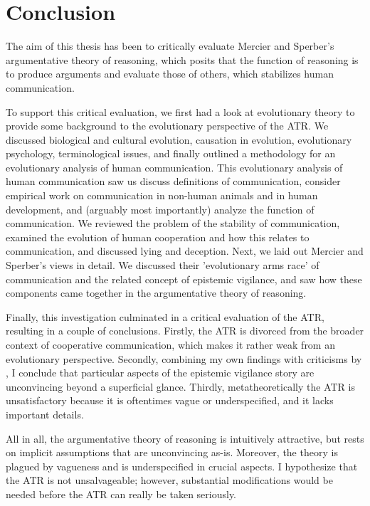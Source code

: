 \chapter*{Conclusion}
\label{ch:conclusion}

The aim of this thesis has been to critically evaluate Mercier and Sperber's argumentative theory of reasoning, which posits that the function of reasoning is to produce arguments and evaluate those of others, which stabilizes human communication.

To support this critical evaluation, we first had a look at evolutionary theory to provide some background to the evolutionary perspective of the ATR.
We discussed biological and cultural evolution, causation in evolution, evolutionary psychology, terminological issues, and finally outlined a methodology for an evolutionary analysis of human communication.
This evolutionary analysis of human communication saw us discuss definitions of communication, consider empirical work on communication in non-human animals and in human development, and (arguably most importantly) analyze the function of communication. We reviewed the problem of the stability of communication, examined the evolution of human cooperation and how this relates to communication, and discussed lying and deception.
Next, we laid out Mercier and Sperber's views in detail. We discussed their 'evolutionary arms race' of communication and the related concept of epistemic vigilance, and saw how these components came together in the argumentative theory of reasoning.

Finally, this investigation culminated in a critical evaluation of the ATR, resulting in a couple of conclusions. Firstly, the ATR is divorced from the broader context of cooperative communication, which makes it rather weak from an evolutionary perspective.
Secondly, combining my own findings with criticisms by \citet{Michaelian13}, I conclude that particular aspects of the epistemic vigilance story are unconvincing beyond a superficial glance.
Thirdly, metatheoretically the ATR is unsatisfactory because it is oftentimes vague or underspecified, and it lacks important details.

All in all, the argumentative theory of reasoning is intuitively attractive, but rests on implicit assumptions that are unconvincing as-is. Moreover, the theory is plagued by vagueness and is underspecified in crucial aspects. I hypothesize that the ATR is not unsalvageable; however, substantial modifications would be needed before the ATR can really be taken seriously.

